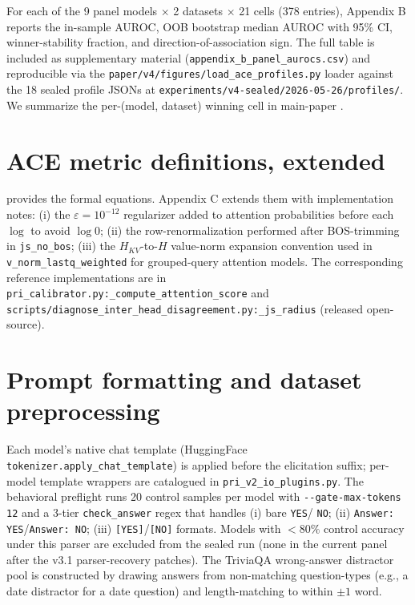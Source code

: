 \documentclass[10pt, letterpaper]{article}
\begin{document}
For each of the 9 panel models $\times$ 2 datasets $\times$ 21 cells
(378 entries), Appendix B reports the in-sample AUROC, OOB bootstrap
median AUROC with 95\% CI, winner-stability fraction, and
direction-of-association sign. The full table is included as
supplementary material (\texttt{appendix\_b\_panel\_aurocs.csv}) and
reproducible via the
\texttt{paper/v4/figures/load\_ace\_profiles.py} loader against the
18 sealed profile JSONs at
\texttt{experiments/v4-sealed/2026-05-26/profiles/}. We summarize the
per-(model, dataset) winning cell in main-paper
.

\section{ACE metric definitions, extended}
\label{app:metrics}

 provides the formal equations. Appendix C
extends them with implementation notes: (i) the
$\varepsilon = 10^{-12}$ regularizer added to attention probabilities
before each $\log$ to avoid $\log 0$; (ii) the row-renormalization
performed after BOS-trimming in \texttt{js\_no\_bos}; (iii) the
$H_{KV}$-to-$H$ value-norm expansion convention used in
\texttt{v\_norm\_lastq\_weighted} for grouped-query attention models.
The corresponding reference implementations are in
\texttt{pri\_calibrator.py:\_compute\_attention\_score} and
\texttt{scripts/diagnose\_inter\_head\_disagreement.py:\_js\_radius}
(released open-source).

\section{Prompt formatting and dataset preprocessing}
\label{app:prompts}

Each model's native chat template (HuggingFace
\texttt{tokenizer.apply\_chat\_template}) is applied before the
elicitation suffix; per-model template wrappers are catalogued in
\texttt{pri\_v2\_io\_plugins.py}. The behavioral preflight
runs 20 control samples per model
with \texttt{-{}-gate-max-tokens 12} and a 3-tier
\texttt{check\_answer} regex that handles (i) bare \texttt{YES}/%
\texttt{NO}; (ii) \texttt{Answer: YES}/\texttt{Answer: NO}; (iii)
\texttt{[YES]}/\texttt{[NO]} formats. Models with $< 80\%$ control
accuracy under this parser are excluded from the sealed run (none in
the current panel after the v3.1 parser-recovery patches). The
TriviaQA wrong-answer distractor pool is constructed by drawing
answers from non-matching question-types (e.g., a date distractor for
a date question) and length-matching to within $\pm 1$ word.
\end{document}
